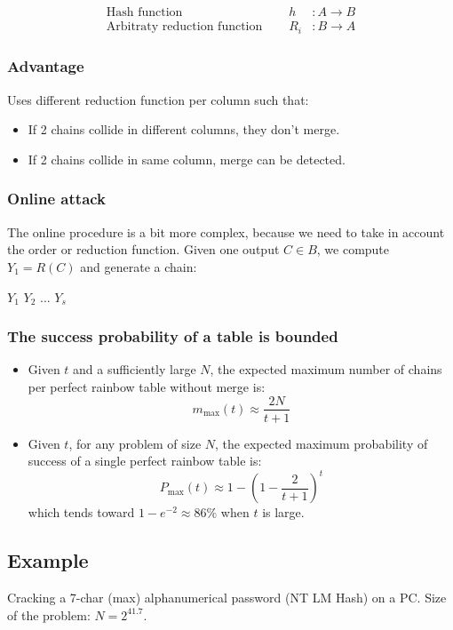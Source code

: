 \begin{eqnarray*}
    \textrm{Hash function } \quad & h &: A \to B \\
    \textrm{Arbitraty reduction function } \quad & R_i &: B \to A 
\end{eqnarray*}

\subsubsection{Advantage}
Uses different reduction function per column such that:
\begin{itemize}
    \item If 2 chains collide in different columns, they don't merge.
    \item If 2 chains collide in same column, merge can be detected.
\end{itemize}

\subsubsection{Online attack}
The online procedure is a bit more complex, because we need to take in
account the order or reduction function.
Given one output $C \in B$, we compute $Y_1 = R(C)$ and generate a
chain: 
\begin{center}
    $Y_1$  $Y_2$  ...  $Y_s $
\end{center}


\subsubsection{The success probability of a table is bounded}
\begin{itemize}
    \item
        Given $t$ and a sufficiently large $N$, the expected maximum number of
        chains per perfect rainbow table without merge is:
        $$ m_{\max}(t)\approx\frac{2N}{t+1} $$
    \item
        Given $t$, for any problem of size $N$, the expected maximum probability of
        success of a single perfect rainbow table is:
        $$ P_{\max}(t)\approx 1 - (1-\frac{2}{t+1})^t $$
        which tends toward $ 1 - e^{-2}\approx 86\% $ when $t$ is large.

\end{itemize}

\subsection{Example}
Cracking a 7-char (max) alphanumerical password (NT LM Hash)
on a PC. Size of the problem: $N = 2^{41.7}$.

